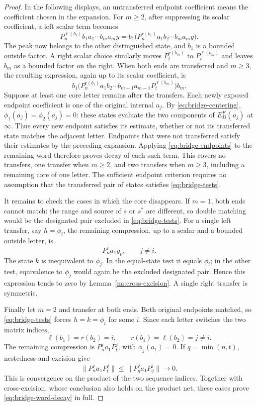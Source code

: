 \begin{proof}
In the following displays, an untransferred endpoint coefficient
means the coefficient chosen in the expansion. For $m\ge2$, after
suppressing its scalar coefficient, a left scalar term becomes
\[
 P_n^{\ell(b_1)}b_1a_1\cdots b_ma_my
 =b_1\bigl(P_n^{r(b_1)}a_1b_2\cdots b_ma_my\bigr).
\]
The peak now belongs to the other distinguished state, and $b_1$
is a bounded outside factor. A right scalar choice similarly moves
$P_t^{r(b_m)}$ to $P_t^{\ell(b_m)}$ and leaves $b_m$ as a bounded
factor on the right. When both ends are transferred and $m\ge3$,
the resulting expression,
again up to its scalar coefficient, is
\[
 b_1\bigl(P_n^{r(b_1)}a_1b_2\cdots
 b_{m-1}a_{m-1}P_t^{\ell(b_m)}\bigr)b_m.
\]
Suppose at least one core letter remains after the transfers. Each
newly exposed endpoint coefficient is one of the original internal
$a_j$. By \eqref{eq:bridge-centering},
$\phi_1(a_j)=\phi_2(a_j)=0$: these states evaluate the two components
of $E_D^F(a_j)$ at $\infty$. Thus every new endpoint satisfies its
estimate, whether or not its transferred state matches the adjacent
letter. Endpoints that were not transferred satisfy their estimates
by the preceding expansion. Applying \eqref{eq:bridge-endpoints}
to the remaining word therefore proves decay of each such term.
This covers no transfers, one transfer when $m\ge2$, and two
transfers when $m\ge3$, including a remaining core of one letter.
The sufficient endpoint criterion requires no assumption that the
transferred pair of states satisfies \eqref{eq:bridge-tests}.

It remains to check the cases in which the core disappears.
If $m=1$, both ends cannot match: the range and source of $s$ or
$s^*$ are different, so double matching would be the designated pair
excluded in \eqref{eq:bridge-tests}. For a single left transfer,
say $h=\phi_i$, the remaining compression, up to a scalar and a
bounded outside letter, is
\[
 P_n^j a_1y_\nu,\qquad j\ne i.
\]
The state $k$ is inequivalent to $\phi_j$. In the equal-state test it
equals $\phi_i$; in the other test, equivalence to $\phi_j$ would
again be the excluded designated pair. Hence this expression tends
to zero by Lemma~\ref{na:cross-excision}. A single right transfer
is symmetric.

Finally let $m=2$ and transfer at both ends. Both original endpoints
matched, so \eqref{eq:bridge-tests} forces $h=k=\phi_i$ for some
$i$. Since each letter switches the two matrix indices,
\[
 \ell(b_1)=r(b_2)=i,
 \qquad r(b_1)=\ell(b_2)=j\ne i.
\]
The remaining compression is $P_n^j a_1P_t^j$, with
$\phi_j(a_1)=0$. If $q=\min(n,t)$, nestedness and excision give
\[
 \|P_n^j a_1P_t^j\|
 \leq\|P_q^j a_1P_q^j\|\longrightarrow0.
\]
This is convergence on the product of the two sequence indices.
Together with cross-excision, whose conclusion also holds on the
product net, these cases prove \eqref{eq:bridge-word-decay} in full.


\end{proof}
